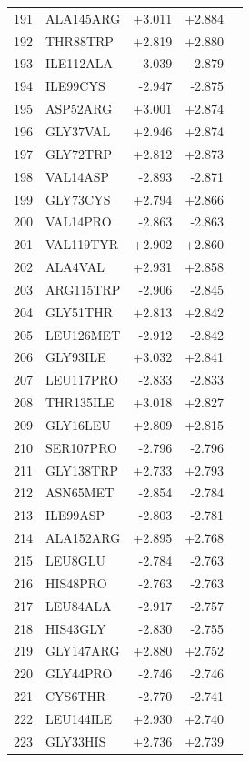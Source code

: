 \begin{longtable}{r l r r c}
191 & ALA145ARG & +3.011 & +2.884 &  \\
192 & THR88TRP & +2.819 & +2.880 &  \\
193 & ILE112ALA & -3.039 & -2.879 &  \\
194 & ILE99CYS & -2.947 & -2.875 &  \\
195 & ASP52ARG & +3.001 & +2.874 &  \\
196 & GLY37VAL & +2.946 & +2.874 &  \\
197 & GLY72TRP & +2.812 & +2.873 &  \\
198 & VAL14ASP & -2.893 & -2.871 &  \\
199 & GLY73CYS & +2.794 & +2.866 &  \\
200 & VAL14PRO & -2.863 & -2.863 &  \\
201 & VAL119TYR & +2.902 & +2.860 &  \\
202 & ALA4VAL & +2.931 & +2.858 &  \\
203 & ARG115TRP & -2.906 & -2.845 &  \\
204 & GLY51THR & +2.813 & +2.842 &  \\
205 & LEU126MET & -2.912 & -2.842 &  \\
206 & GLY93ILE & +3.032 & +2.841 &  \\
207 & LEU117PRO & -2.833 & -2.833 &  \\
208 & THR135ILE & +3.018 & +2.827 &  \\
209 & GLY16LEU & +2.809 & +2.815 &  \\
210 & SER107PRO & -2.796 & -2.796 &  \\
211 & GLY138TRP & +2.733 & +2.793 &  \\
212 & ASN65MET & -2.854 & -2.784 &  \\
213 & ILE99ASP & -2.803 & -2.781 &  \\
214 & ALA152ARG & +2.895 & +2.768 &  \\
215 & LEU8GLU & -2.784 & -2.763 &  \\
216 & HIS48PRO & -2.763 & -2.763 &  \\
217 & LEU84ALA & -2.917 & -2.757 &  \\
218 & HIS43GLY & -2.830 & -2.755 &  \\
219 & GLY147ARG & +2.880 & +2.752 &  \\
220 & GLY44PRO & -2.746 & -2.746 &  \\
221 & CYS6THR & -2.770 & -2.741 &  \\
222 & LEU144ILE & +2.930 & +2.740 &  \\
223 & GLY33HIS & +2.736 & +2.739 &  \\

\end{longtable}
